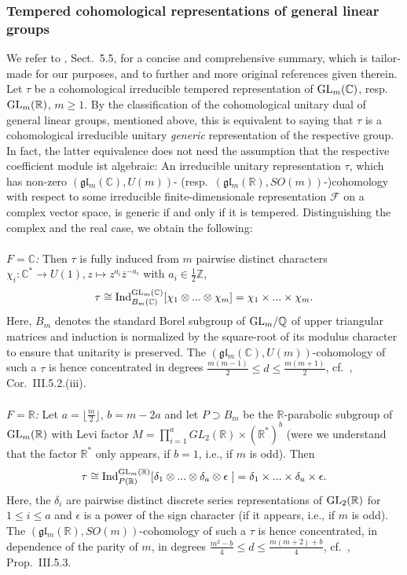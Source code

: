\documentclass[a4paper,10pt]{amsart}
\theoremstyle{definition}
\numberwithin{equation}{section}
\def\R{\mathbb R}
\def\Z{\mathbb Z}
\def\Q{\mathbb Q}
\def\C{\mathbb C}
\def\cF{\mathcal F}
\def\ra{\rightarrow}
\def\g{\mathfrak g}
\def\l{\mathfrak l}
\def\GL{{\rm GL}}
\begin{document}
\subsubsection{Tempered cohomological representations of general linear groups}\label{sect:tempGLcoh}
We refer to \cite{grob-ragh}, Sect.\ 5.5, for a concise and comprehensive summary, which is tailor-made for our purposes, and to further and more original references given therein. Let $\tau$ be a cohomological irreducible tempered representation of $\GL_m(\C)$, resp.\ $\GL_m(\R)$, $m\geq 1$. By the classification of the cohomological unitary dual of general linear groups, mentioned above, this is equivalent to saying that $\tau$ is a cohomological irreducible unitary {\it generic} representation of the respective group. In fact, the latter equivalence does not need the assumption that the respective coefficient module ist algebraic: An irreducible unitary representation $\tau$, which has non-zero $(\g\l_m(\C), U(m))$- (resp.\ $(\g\l_m(\R), SO(m))$-)cohomology with respect to some irreducible finite-dimensionale representation $\cF$ on a complex vector space, is generic if and only if it is tempered. Distinguishing the complex and the real case, we obtain the following:\\\\
{\it $F=\C$:} Then $\tau$ is fully induced from $m$ pairwise distinct characters $\chi_i: \C^*\ra U(1), z\mapsto z^{a_i}\overline{z}^{-a_i}$ with $a_i\in \tfrac12 \Z$,
$$\tau\cong {\rm Ind}_{B_m(\C)}^{\GL_m(\C)}[\chi_1\otimes...\otimes\chi_m]=\chi_1\times...\times\chi_m.$$
Here, $B_m$ denotes the standard Borel subgroup of $\GL_m/\Q$ of upper triangular matrices and induction is normalized by the square-root of its modulus character to ensure that unitarity is preserved. The $(\g\l_m(\C), U(m))$-cohomology of such a $\tau$ is hence concentrated in degrees $\tfrac{m(m-1)}{2}\leq d\leq \tfrac{m(m+1)}{2}$, cf.\ \cite{bowa}, Cor.\ III.5.2.(iii). \\\\
{\it $F=\R$:} Let $a=\lfloor\frac{m}{2}\rfloor$, $b=m-2a$ and let $P\supset B_m$ be the $\R$-parabolic subgroup of $\GL_m(\R)$ with Levi factor $M=\prod_{i=1}^{a} GL_{2}(\R)\times(\R^*)^b$ (were we understand that the factor $\R^*$ only appears, if $b=1$, i.e., if $m$ is odd). Then 
$$\tau\cong\textrm{Ind}^{\GL_m(\R)}_{P(\R)}[\delta_1\otimes...\otimes\delta_{a}\otimes\epsilon \ ]=\delta_1\times...\times\delta_{a}\times\epsilon.$$
Here, the $\delta_i$ are pairwise distinct discrete series representations of $\GL_2(\R)$ for $1\leq i\leq a$ and $\epsilon$ is a power of the sign character (if it appears, i.e., if $m$ is odd). The $(\g\l_m(\R), SO(m))$-cohomology of such a $\tau$ is hence concentrated, in dependence of the parity of $m$, in degrees $\tfrac{m^2-b}{4} \leq d\leq \tfrac{m(m+2)+b}{4}$, cf.\ \cite{bowa}, Prop.\ III.5.3.\\\\
\end{document}
